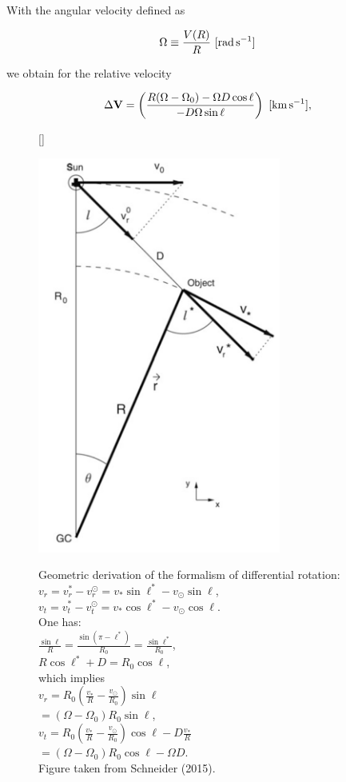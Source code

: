 \documentclass[a4paper,10pt]{article}
\begin{document}
{\noindent}With the angular velocity defined as

\begin{align*}
    \Omega \equiv \frac{V(R)}{R} ~ [{\rm rad\,s^{-1}}]
\end{align*}

{\noindent}we obtain for the relative velocity

\begin{align*}
    \Delta\mathbf{V} = \left(\frac{R(\Omega-\Omega_0) - \Omega D\cos\ell}{-D\Omega\sin\ell}\right) ~ [{\rm km\,s^{-1}}],
\end{align*}

\begin{figure}[t]
    [\FBwidth]
    {\caption{\footnotesize{Geometric derivation of the formalism of differential rotation:\\
    $v_r=v_r^*-v_r^\odot=v_*\sin\ell^*-v_\odot\sin\ell$, \\
    $v_t = v_t^*-v_t^\odot=v_*\cos\ell^*-v_\odot\cos\ell$. \\
    One has: \\
    $\frac{\sin\ell}{R}=\frac{\sin(\pi-\ell^*)}{R_0}=\frac{\sin\ell^*}{R_0}$, \\
    $R\cos\ell^*+D=R_0\cos\ell$, \\
    which implies\\
    $v_r=R_0 \left(\frac{v_*}{R}-\frac{v_\odot}{R_0}\right) \sin\ell$ \\
    $=(\Omega-\Omega_0)R_0\sin\ell$, \\ 
    $v_t=R_0 \left(\frac{v_*}{R}-\frac{v_\odot}{R_0}\right) \cos\ell -D\frac{v_*}{R}$ \\
    $=(\Omega-\Omega_0)R_0\cos\ell -\Omega D$. \\
    Figure taken from Schneider (2015).}}
    \label{fig:differentialrotation}}
    {\includegraphics[width=8cm]{figures/DifferentialRotation.png}}
\end{figure}
\end{document}
